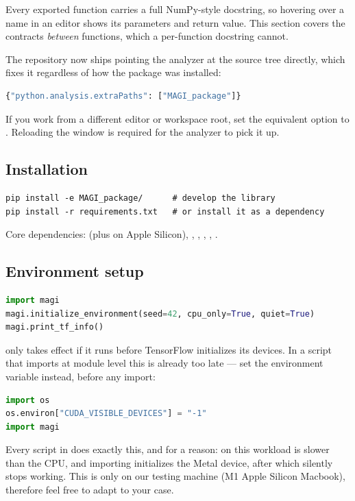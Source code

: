 \documentclass[11pt,a4paper]{article}
\begin{document}
Every exported function carries a full NumPy-style docstring, so hovering over
a name in an editor shows its parameters and return value. This section covers
the contracts \emph{between} functions, which a per-function docstring cannot.

\begin{magiwarn}
The repository now ships  pointing the analyzer at
the source tree directly, which fixes it regardless of how the package was
installed:

\begin{lstlisting}[language=Python]
{"python.analysis.extraPaths": ["MAGI_package"]}
\end{lstlisting}

If you work from a different editor or workspace root, set the equivalent
option to . Reloading the window is required for the
analyzer to pick it up.
\end{magiwarn}

\subsection{Installation}

\begin{lstlisting}[language=shell]
pip install -e MAGI_package/      # develop the library
pip install -r requirements.txt   # or install it as a dependency
\end{lstlisting}

Core dependencies:  (plus  on Apple
Silicon), , , ,
, .

\subsection{Environment setup}

\begin{lstlisting}[language=Python]
import magi
magi.initialize_environment(seed=42, cpu_only=True, quiet=True)
magi.print_tf_info()
\end{lstlisting}

\begin{magiwarn}
 only takes effect if it runs before TensorFlow
initializes its devices. In a script that imports  at module level
this is already too late --- set the environment variable instead, before any
import:

\begin{lstlisting}[language=Python]
import os
os.environ["CUDA_VISIBLE_DEVICES"] = "-1"
import magi
\end{lstlisting}

Every script in  does exactly this, and for a reason: on this
workload  is slower than the CPU, and importing
 initializes the Metal device, after which
 silently stops working. This is only on our testing machine (M1 Apple Silicon Macbook), therefore feel free to adapt to your case.
\end{magiwarn}
\end{document}
